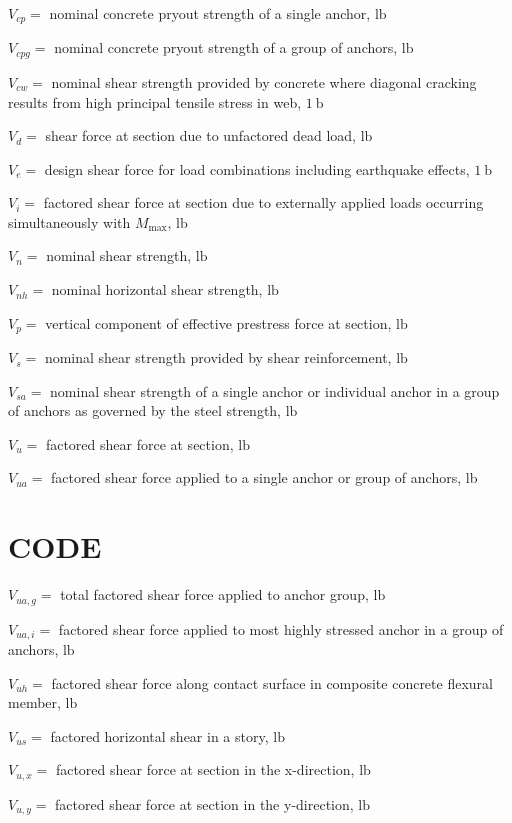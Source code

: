 \documentclass[10pt]{article}
\begin{document}
$V_{c p}=$ nominal concrete pryout strength of a single anchor, $\mathrm{lb}$

$V_{c p g}=$ nominal concrete pryout strength of a group of anchors, $\mathrm{lb}$

$V_{c w}=$ nominal shear strength provided by concrete where diagonal cracking results from high principal tensile stress in web, $1 \mathrm{~b}$

$V_{d}=$ shear force at section due to unfactored dead load, $\mathrm{lb}$

$V_{e}=$ design shear force for load combinations including earthquake effects, $1 \mathrm{~b}$

$V_{i}=$ factored shear force at section due to externally applied loads occurring simultaneously with $M_{\max }$, $\mathrm{lb}$

$V_{n}=$ nominal shear strength, $\mathrm{lb}$

$V_{n h}=$ nominal horizontal shear strength, $\mathrm{lb}$

$V_{p}=$ vertical component of effective prestress force at section, $\mathrm{lb}$

$V_{s}=$ nominal shear strength provided by shear reinforcement, $\mathrm{lb}$

$V_{s a}=$ nominal shear strength of a single anchor or individual anchor in a group of anchors as governed by the steel strength, $\mathrm{lb}$

$V_{u}=$ factored shear force at section, $\mathrm{lb}$

$V_{u a}=$ factored shear force applied to a single anchor or group of anchors, lb

\section*{CODE}
$V_{u a, g}=$ total factored shear force applied to anchor group, $\mathrm{lb}$

$V_{u a, i}=$ factored shear force applied to most highly stressed anchor in a group of anchors, $\mathrm{lb}$

$V_{u h}=$ factored shear force along contact surface in composite concrete flexural member, $\mathrm{lb}$

$V_{u s}=$ factored horizontal shear in a story, $\mathrm{lb}$

$V_{u, x}=$ factored shear force at section in the x-direction, $\mathrm{lb}$

$V_{u, y}=$ factored shear force at section in the y-direction, $\mathrm{lb}$
\end{document}
